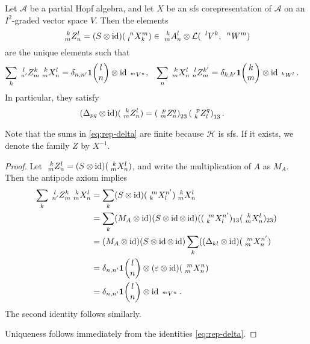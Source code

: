 \begin{Lem} \label{lemma:rep-corep} Let $\mathscr{A}$ be a partial Hopf algebra, and let $X$ be an sfs corepresentation of $\mathscr{A}$ on an $I^2$-graded vector space $V$.
  Then the elements %
  \[\Gr{Z}{k}{l}{m}{n} =(S \otimes
  \id)(\Gr{X}{n}{m}{l}{k}) \in
    \Gr{A}{k}{l}{m}{n} \otimes
    \mathcal{L}(\Gru{V}{l}{k},\Gru{W}{n}{m})\] are the unique elements such  that
  \begin{align}\label{eq:rep-delta}
    \sum_{k} \Gr{Z}{l}{k}{n'}{m} \Gr{X}{k}{l}{m}{n} &= \delta_{n,n'}
    \UnitC{l}{n} \otimes \id_{\Gru{V}{m}{n}}, &
    \sum_{n} \Gr{X}{k}{l}{m}{n} \Gr{Z}{l}{k'}{n}{m} &= \delta_{k,k'}
    \UnitC{k}{m}\otimes \id_{\Gru{W}{k}{l}}.
  \end{align}
   In particular, they satisfy
  \begin{align*}
    (\Delta_{pq} \otimes \id)(\Gr{Z}{k}{l}{m}{n}) &=
    \left(\Gr{Z}{p}{q}{m}{n}\right)_{23}\left(\Gr{Z}{p}{q}{k}{l}\right)_{13}.
  \end{align*}
\end{Lem}
Note that the sums in \eqref{eq:rep-delta} are finite because $\mathcal{H}$ is sfs. If it exists, we denote the family $Z$ by $X^{-1}$.
\begin{proof}
 Let  $\Gr{Z}{k}{l}{m}{n}=(S \otimes \id)(\Gr{X}{k}{l}{m}{n})$, and write the multiplication of $A$ as $M_A$. Then the antipode axiom implies
   \begin{align*}
     \sum_{k} \Gr{Z}{l}{k}{n'}{m} \Gr{X}{k}{l}{m}{n} &= \sum_{k}
     (S\otimes \id)(\Gr{X}{m}{n'}{k}{l}) \Gr{X}{k}{l}{m}{n}
     \\
     &=\sum_{k} (M_A \otimes \id)(S\otimes \id \otimes \id) (
     (\Gr{X}{m}{n
       '}{k}{l})_{13}(\Gr{X}{k}{l}{m}{n})_{23}) \\
     &= (M_A\otimes \id)(S\otimes \id \otimes \id)\sum_{k}((\Delta_{kl}
     \otimes \id)(\Gr{X}{m}{n'}{m}{n}) \\
     &= \delta_{n,n'} \UnitC{l}{n}\otimes (\varepsilon\otimes \id)(\Gr{X}{m}{n}{m}{n}) \\
     &= \delta_{n,n'}\UnitC{l}{n} \otimes 
     \id_{\Gru{V}{m}{n}}.
   \end{align*} The second identity follows
   similarly.

 Uniqueness follows immediately from the identities  \eqref{eq:rep-delta}.
\end{proof}

